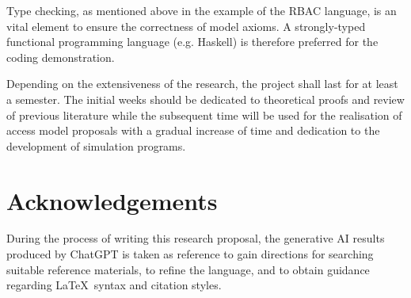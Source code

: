 \documentclass{article}
\begin{document}
Type checking, as mentioned above in the example of the RBAC language, is an vital element to ensure the correctness of model axioms. A strongly-typed functional programming language (e.g. Haskell) is therefore preferred for the coding demonstration.

Depending on the extensiveness of the research, the project shall last for at least a semester. The initial weeks should be dedicated to theoretical proofs and review of previous literature while the subsequent time will be used for the realisation of access model proposals with a gradual increase of time and dedication to the development of simulation programs.

\newpage




\section*{Acknowledgements}

During the process of writing this research proposal, the generative AI results produced by ChatGPT is taken as reference to gain directions for searching suitable reference materials, to refine the language, and to obtain guidance regarding \LaTeX\ syntax and citation styles.
\end{document}
